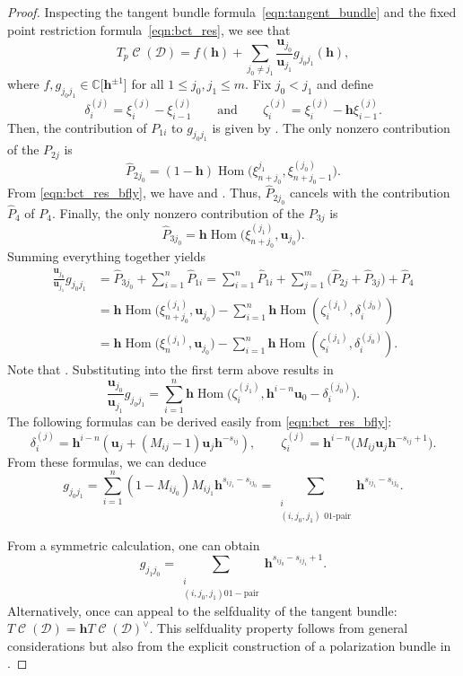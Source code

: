 \documentclass[11pt]{article}
\numberwithin{equation}{section}
\newcommand{\brane}{\mathcal D}
\newcommand{\CC}{\mathbb C}
\newcommand{\hb}{\mathbf h}
\newcommand{\ub}{\mathbf u}
\DeclareMathOperator{\bowvar}{\mathcal C}
\DeclareMathOperator{\Hom}{Hom}
\begin{document}
\begin{proof}
Inspecting the tangent bundle formula~\eqref{eqn:tangent_bundle} and the fixed point restriction formula~\eqref{eqn:bct_res}, we see that
\[
T_p\bowvar(\brane) = f(\hb) + \sum_{j_0 \neq j_1} \frac{\ub_{j_0}}{\ub_{j_1}} g_{j_0j_1}(\hb),
\]
where $f, g_{j_0j_1} \in \CC\big[\hb^{\pm 1}\big]$ for all $1\leq j_0, j_1 \leq m$. Fix $j_0 < j_1$ and define
\[
\delta_i^{(j)} = \xi_i^{(j)} - \xi_{i-1}^{(j)} \qquad \text{and} \qquad
\zeta_i^{(j)} = \xi_i^{(j)} - \hb\xi_{i-1}^{(j)}.
\] Then, the contribution of $P_{1i}$ to $g_{j_0j_1}$ is given by \smash{$\hat{P}_{1i} = -\hb\Hom\bigl(\zeta_i^{(j_1)}, \delta_i^{(j_0)}\bigr)$}.
The only nonzero contribution of the $P_{2j}$ is
\[
\hat{P}_{2j_0} = (1-\hb)\Hom\bigl(\xi_{n+j_0}^{j_1}, \xi_{n+j_0 - 1}^{(j_0)}\bigr).
\]
 From \eqref{eqn:bct_res_bfly}, we have  and . Thus, $\hat{P}_{2j_0}$ cancels with the contribution~$\hat{P}_4$ of $P_4$. Finally, the only nonzero contribution of the $P_{3j}$ is
 \[
 \hat{P}_{3j_0} = \hb\Hom\bigl(\xi_{n+j_0}^{(j_1)}, \ub_{j_0}\bigr).
 \] Summing everything together yields
\begin{align*}
\frac{\ub_{j_0}}{\ub_{j_1}}g_{j_0j_1} &= \hat{P}_{3j_0} + \sum_{i=1}^n \hat{P}_{1i}
= \sum_{i=1}^n \hat{P}_{1i} + \sum_{j=1}^m \bigl( \hat{P}_{2j} + \hat{P}_{3j} \bigr) + \hat{P}_4 \\
&= \hb\Hom\bigl(\xi_{n+j_0}^{(j_1)}, \ub_{j_0}\bigr) - \sum_{i=1}^n \hb\Hom(\zeta_i^{(j_1)}, \delta_i^{(j_0)}) \\
&= \hb\Hom\bigl(\xi_n^{(j_1)}, \ub_{j_0}\bigr) -\sum_{i=1}^n \hb\Hom(\zeta_i^{(j_1)}, \delta_i^{(j_0)}).
\end{align*}
Note that \smash{$\xi_n^{(j)} = \sum_{i=1}^n \hb^{n-i}\zeta_i^{(j)}$}. Substituting into the first term above results in
\[
\frac{\ub_{j_0}}{\ub_{j_1}}g_{j_0j_1} = \sum_{i=1}^n\hb\Hom\bigl(\zeta_i^{(j_1)}, \hb^{i-n}\ub_0 - \delta_i^{(j_0)}\bigr).
\]
The following formulas can be derived easily from \eqref{eqn:bct_res_bfly}:
\[
\delta_i^{(j)} = \hb^{i-n}(\ub_j + (M_{ij} - 1)\ub_j\hb^{-s_{ij}}),\qquad \zeta_i^{(j)} = \hb^{i-n} \bigl(M_{ij}\ub_j\hb^{-s_{ij}+1}\bigr).
\]
From these formulas, we can deduce
\[
g_{j_0j_1} = \sum_{i=1}^n (1-M_{ij_0})M_{ij_1}\hb^{s_{ij_1}-s_{ij_0}} = \sum_{\substack{i \\ (i, j_0, j_1) \text{ 01-pair}}} \hb^{s_{ij_1}-s_{ij_0}}.
\]

From a symmetric calculation, one can obtain
\[
g_{j_1j_0} = \sum_{\substack{i \\ (i, j_0, j_1) \mathrm{01-pair}}} \hb^{s_{ij_0}-s_{ij_1}+1}.
\]
Alternatively, once can appeal to the selfduality of the tangent bundle: $T\bowvar(\brane) = \hb T\bowvar(\brane)^\vee$. This selfduality property follows from general considerations but also from the explicit construction of a polarization bundle in \cite[Section~4.4.2]{S}.


\end{proof}
\end{document}
